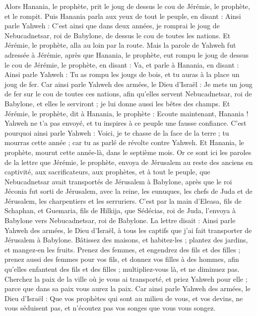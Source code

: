 \begin{multicols}{2}
Alors Hanania, le prophète, prit le joug de dessus le cou de Jérémie, le prophète, et le rompit.
Puis Hanania parla aux yeux de tout le peuple, en disant : Ainsi parle Yahweh : C'est ainsi que dans deux années, je romprai le joug de Nebucadnetsar, roi de Babylone, de dessus le cou de toutes les nations. Et Jérémie, le prophète, alla au loin par la route.
Mais la parole de Yahweh fut adressée à Jérémie, après que Hanania, le prophète, eut rompu le joug de dessus le cou de Jérémie, le prophète, en disant :
Va, et parle à Hanania, en disant : Ainsi parle Yahweh : Tu as rompu les jougs de bois, et tu auras à la place un joug de fer.
Car ainsi parle Yahweh des armées, le Dieu d'Israël : Je mets un joug de fer sur le cou de toutes ces nations, afin qu'elles servent Nebucadnetsar, roi de Babylone, et elles le serviront ; je lui donne aussi les bêtes des champs.
Et Jérémie, le prophète, dit à Hanania, le prophète : Ecoute maintenant, Hanania ! Yahweh ne t'a pas envoyé, et tu inspires à ce peuple une fausse confiance.
C'est pourquoi ainsi parle Yahweh : Voici, je te chasse de la face de la terre ; tu mourras cette année ; car tu as parlé de révolte contre Yahweh.
Et Hanania, le prophète, mourut cette année-là, dans le septième mois.
\VerseOne{}Or ce sont ici les paroles de la lettre que Jérémie, le prophète, envoya de Jérusalem au reste des anciens en captivité, aux sacrificateurs, aux prophètes, et à tout le peuple, que Nebucadnetsar avait transportés de Jérusalem à Babylone,
après que le roi Jéconia fut sorti de Jérusalem, avec la reine, les eunuques, les chefs de Juda et de Jérusalem, les charpentiers et les serruriers.
C'est par la main d'Eleasa, fils de Schaphan, et Guemaria, fils de Hilkija, que Sédécias, roi de Juda, l'envoya à Babylone vers Nebucadnetsar, roi de Babylone. La lettre disait :
Ainsi parle Yahweh des armées, le Dieu d'Israël, à tous les captifs que j'ai fait transporter de Jérusalem à Babylone.
Bâtissez des maisons, et habitez-les ; plantez des jardins, et mangez-en les fruits.
Prenez des femmes, et engendrez des fils et des filles ; prenez aussi des femmes pour vos fils, et donnez vos filles à des hommes, afin qu'elles enfantent des fils et des filles ; multipliez-vous là, et ne diminuez pas.
Cherchez la paix de la ville où je vous ai transporté, et priez Yahweh pour elle ; parce que dans sa paix vous aurez la paix.
Car ainsi parle Yahweh des armées, le Dieu d'Israël : Que vos prophètes qui sont au milieu de vous, et vos devins, ne vous séduisent pas, et n'écoutez pas vos songes que vous vous songez.

\end{multicols}
